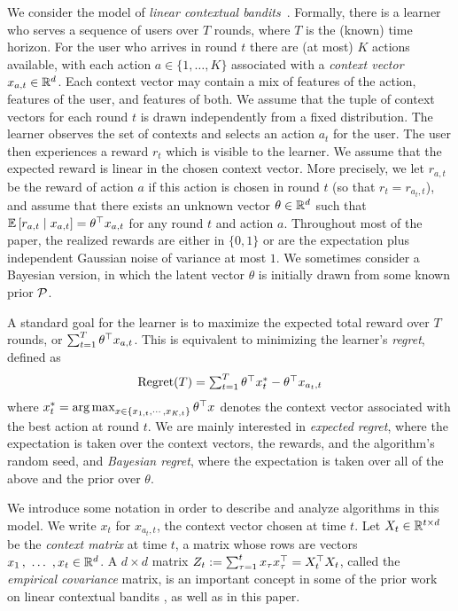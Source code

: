 We consider the model of \emph{linear contextual
  bandits}~\citep{Langford-www10,chu2011contextual}. Formally, there
is a learner who serves a sequence of users over $T$ rounds, where $T$
is the (known) time horizon.  For the user who arrives in round $t$ there are
(at most) $K$ actions available, with each action
$a\in \{1, \ldots , K\}$ associated with a \emph{context vector}
$x_{a,t} \in \mathbb{R}^d$. Each context vector may contain a mix of features
of the action, features of the user, and features of both.  We assume
that the tuple of context vectors for each round $t$ is drawn
independently from a fixed distribution.  The learner observes the set
of contexts and selects an action $a_t$ for the user. The user then
experiences a reward $r_t$ which is visible to the learner. We assume
that the expected reward is linear in the chosen context vector. More
precisely, we let $r_{a,t}$ be the reward of action $a$ if this action
is chosen in round $t$ (so that $r_t = r_{a_t,t}$), and assume that
there exists an unknown vector $\theta\in\mathbb{R}^d$ such that
$\mathbb{E}\left[r_{a, t}\mid x_{a, t}\right] = \theta^{\top} x_{a, t}$ for any round $t$
and action $a$. Throughout most of the paper, the realized rewards are
either in $\{0,1\}$ or are the expectation plus independent Gaussian
noise of variance at most $1$. We sometimes consider a Bayesian
version, in which the latent vector $\theta$ is initially drawn from some
known prior $\mathcal{P}$. 

A standard goal for the learner is to maximize the expected total
reward over $T$ rounds, or $\sum_{t=1}^T \theta^{\top} x_{a, t}$. This
is equivalent to minimizing the learner's \emph{regret}, defined as 
\begin{align}\label{eq:regret-def}
\text{Regret}(T) = \textstyle
    \sum_{t=1}^T \theta^{\top} x_t^* -
\theta^{\top} x_{a_t, t} 
\end{align}
 where $x^*_{t} = \operatorname*{arg\,max}_{x \in
\{x_{1,t}, \cdots, x_{K,t}\}} \theta^{\top} x$ denotes the
context vector associated with the best action at round $t$. We are mainly
interested in \emph{expected regret}, where the expectation is taken over the
context vectors, the rewards, and the algorithm's random seed, and
\emph{Bayesian regret}, where the expectation is taken over all of the above and
the prior over $\theta$.

We introduce some notation in order to describe and
analyze algorithms in this model. We write $x_t$ for $x_{a_t,t}$, the context vector chosen at time $t$. Let $X_t\in \mathbb{R}^{t\times d}$ be the \emph{context matrix} at time
$t$, a matrix whose rows are vectors $x_1 \, ,\ \ldots\ , x_t\in \mathbb{R}^d $.
A $d\times d$ matrix
    $Z_t :=\sum_{\tau=1}^t x_\tau x_\tau^{\top} = X_t^{\top} X_t$,
called the \emph{empirical covariance} matrix, is an important concept in some of the prior work on linear contextual bandits
\citep[\eg][]{abbasi2011improved,kannan2018smoothed}, as well as in this paper.

